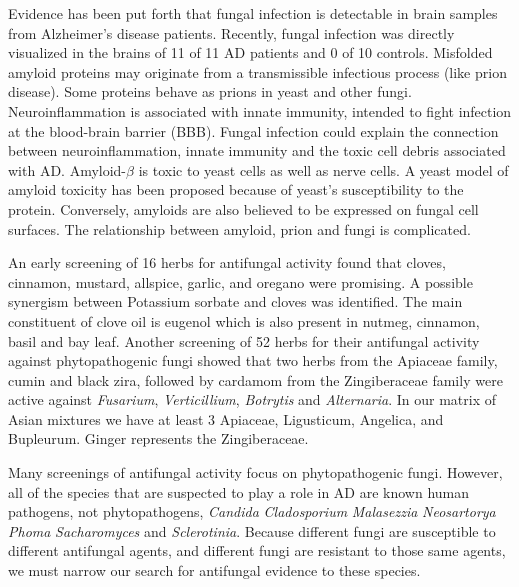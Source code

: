 \documentclass[twocolumn]{article}
\begin{document}
Evidence has been put forth that fungal infection is detectable
in brain samples from Alzheimer's disease patients.
\cite{alonso2013fungal}
Recently, fungal infection was directly visualized in the brains
of 11 of 11 AD patients and 0 of 10 controls.
\cite{pisa2015different}
Misfolded amyloid proteins may originate from a transmissible infectious process
(like prion disease).
Some proteins behave as prions in yeast and other fungi.
\cite{soto2006amyloids}
Neuroinflammation is associated with innate immunity,
intended to fight infection at the blood-brain barrier (BBB).
\cite{hauwel2005innate}
Fungal infection could explain the connection between
neuroinflammation, innate immunity and the toxic cell
debris associated with AD.
Amyloid-$\beta$ is toxic to yeast cells
as well as nerve cells.
A yeast model of amyloid toxicity has been proposed
because of yeast's susceptibility to the protein.
\cite{treusch2011functional}
Conversely, amyloids are also believed to be
expressed on fungal cell surfaces.
\cite{gebbink2005amyloids}
The relationship between amyloid, prion and fungi is complicated.
\cite{tessier2009unraveling}






%
An early screening of 16 herbs for antifungal activity
found that cloves, cinnamon, mustard, allspice, garlic, and oregano
were promising.
A possible synergism between Potassium sorbate and cloves
was identified.
\cite{azzouz1982comparative}
The main constituent of clove oil is eugenol which
is also present in nutmeg, cinnamon, basil and bay leaf.
\cite{?}
Another screening of 52 herbs for their antifungal activity
against phytopathogenic fungi showed that two herbs from the Apiaceae family,
cumin and black zira, followed by cardamom from the Zingiberaceae family
were active against \textit{Fusarium}, \textit{Verticillium},
\textit{Botrytis} and \textit{Alternaria}.
In our matrix of Asian mixtures we have at least 3 Apiaceae,
Ligusticum,
Angelica,
and Bupleurum.
Ginger represents the Zingiberaceae.


Many screenings of antifungal activity focus on phytopathogenic fungi.
However, all of the species that are suspected to play a role in
AD are known human pathogens, not phytopathogens,
\textit{Candida}
\textit{Cladosporium}
\textit{Malasezzia}
\textit{Neosartorya}
\textit{Phoma}
\textit{Sacharomyces}
and \textit{Sclerotinia}.
Because different fungi are susceptible to different antifungal agents,
and different fungi are resistant to those same agents,
we must narrow our search for antifungal evidence to these species.
\end{document}
